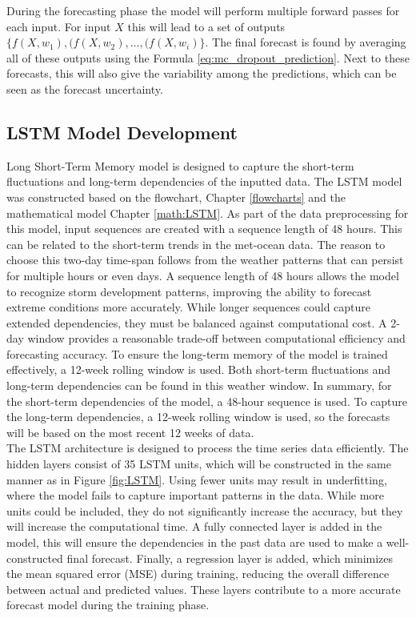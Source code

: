 \noindent During the forecasting phase the model will perform multiple forward passes for each input. For input \(X\) this will lead to a set of outputs \(\{f(X,w_1),(f(X,w_2),...,(f(X,w_i)\}\). The final forecast is found by averaging all of these outputs using the Formula \ref{eq:mc_dropout_prediction}. Next to these forecasts, this will also give the variability among the predictions, which can be seen as the forecast uncertainty.

\subsection{LSTM Model Development}
Long Short-Term Memory model is designed to capture the short-term fluctuations and long-term dependencies of the inputted data. The LSTM model was constructed based on the flowchart, Chapter \ref{flowcharts} and the mathematical model Chapter \ref{math:LSTM}. As part of the data preprocessing for this model, input sequences are created with a sequence length of 48 hours. This can be related to the short-term trends in the met-ocean data. The reason to choose this two-day time-span follows from the weather patterns that can persist for multiple hours or even days. A sequence length of 48 hours allows the model to recognize storm development patterns, improving the ability to forecast extreme conditions more accurately. While longer sequences could capture extended dependencies, they must be balanced against computational cost. A 2-day window provides a reasonable trade-off between computational efficiency and forecasting accuracy. To ensure the long-term memory of the model is trained effectively, a 12-week rolling window is used. Both short-term fluctuations and long-term dependencies can be found in this weather window. In summary, for the short-term dependencies of the model, a 48-hour sequence is used. To capture the long-term dependencies, a 12-week rolling window is used, so the forecasts will be based on the most recent 12 weeks of data. \\

\noindent The LSTM architecture is designed to process the time series data efficiently. The hidden layers consist of 35 LSTM units, which will be constructed in the same manner as in Figure \ref{fig:LSTM}. Using fewer units may result in underfitting, where the model fails to capture important patterns in the data. While more units could be included, they do not significantly increase the accuracy, but they will increase the computational time. A fully connected layer is added in the model, this will ensure the dependencies in the past data are used to make a well-constructed final forecast. Finally, a regression layer is added, which minimizes the mean squared error (MSE) during training, reducing the overall difference between actual and predicted values. These layers contribute to a more accurate forecast model during the training phase.

